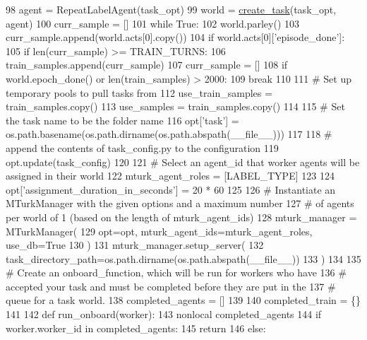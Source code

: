 \begin{DoxyCode}
98     agent = RepeatLabelAgent(task\_opt)
99     world = \hyperlink{namespaceparlai_1_1core_1_1worlds_a79969c7ba76d4b3c500f5bb776444dc6}{create\_task}(task\_opt, agent)
100     curr\_sample = []
101     \textcolor{keywordflow}{while} \textcolor{keyword}{True}:
102         world.parley()
103         curr\_sample.append(world.acts[0].copy())
104         \textcolor{keywordflow}{if} world.acts[0][\textcolor{stringliteral}{'episode\_done'}]:
105             \textcolor{keywordflow}{if} len(curr\_sample) >= TRAIN\_TURNS:
106                 train\_samples.append(curr\_sample)
107             curr\_sample = []
108         \textcolor{keywordflow}{if} world.epoch\_done() \textcolor{keywordflow}{or} len(train\_samples) > 2000:
109             \textcolor{keywordflow}{break}
110 
111     \textcolor{comment}{# Set up temporary pools to pull tasks from}
112     use\_train\_samples = train\_samples.copy()
113     use\_samples = train\_samples.copy()
114 
115     \textcolor{comment}{# Set the task name to be the folder name}
116     opt[\textcolor{stringliteral}{'task'}] = os.path.basename(os.path.dirname(os.path.abspath(\_\_file\_\_)))
117 
118     \textcolor{comment}{# append the contents of task\_config.py to the configuration}
119     opt.update(task\_config)
120 
121     \textcolor{comment}{# Select an agent\_id that worker agents will be assigned in their world}
122     mturk\_agent\_roles = [LABEL\_TYPE]
123 
124     opt[\textcolor{stringliteral}{'assignment\_duration\_in\_seconds'}] = 20 * 60
125 
126     \textcolor{comment}{# Instantiate an MTurkManager with the given options and a maximum number}
127     \textcolor{comment}{# of agents per world of 1 (based on the length of mturk\_agent\_ids)}
128     mturk\_manager = MTurkManager(
129         opt=opt, mturk\_agent\_ids=mturk\_agent\_roles, use\_db=\textcolor{keyword}{True}
130     )
131     mturk\_manager.setup\_server(
132         task\_directory\_path=os.path.dirname(os.path.abspath(\_\_file\_\_))
133     )
134 
135     \textcolor{comment}{# Create an onboard\_function, which will be run for workers who have}
136     \textcolor{comment}{# accepted your task and must be completed before they are put in the}
137     \textcolor{comment}{# queue for a task world.}
138     completed\_agents = []
139 
140     completed\_train = \{\}
141 
142     \textcolor{keyword}{def }run\_onboard(worker):
143         nonlocal completed\_agents
144         \textcolor{keywordflow}{if} worker.worker\_id \textcolor{keywordflow}{in} completed\_agents:
145             \textcolor{keywordflow}{return}
146         \textcolor{keywordflow}{else}:

\end{DoxyCode}
